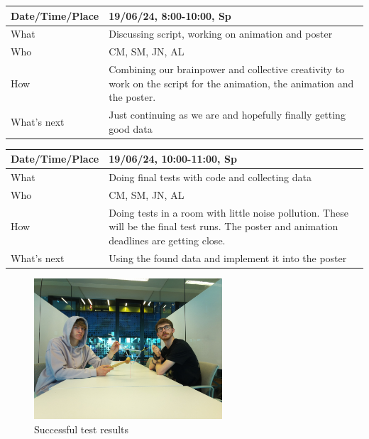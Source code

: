 \documentclass{article}
\begin{document}
\begin{table}[H]
\begin{tabular}{|p{1.5in}|p{4in}|}
\hline
Date/Time/Place & 19/06/24, 8:00-10:00, Sp \\ \hline
What            & Discussing script, working on animation and poster \\ \hline
Who             & CM, SM, JN, AL \\ \hline
How             & Combining our brainpower and collective creativity to work on the script for the animation, the animation and the poster. \\ \hline
What's next     & Just continuing as we are and hopefully finally getting good data  \\ \hline
\end{tabular}
\end{table}

\begin{table}[H]
\begin{tabular}{|p{1.5in}|p{4in}|}
\hline
Date/Time/Place & 19/06/24, 10:00-11:00, Sp \\ \hline
What            & Doing final tests with code and collecting data \\ \hline
Who             & CM, SM, JN, AL \\ \hline
How             & Doing tests in a room with little noise pollution. These will be the final test runs. The poster and animation deadlines are getting close.\\ \hline
What's next     & Using the found data and implement it into the poster \\ \hline
\end{tabular}
\end{table}

\begin{figure}[H]
    \centering
    \includegraphics[width=7cm]{finalpicture.png}
    \caption{Successful test results}   
\end{figure}
\end{document}
